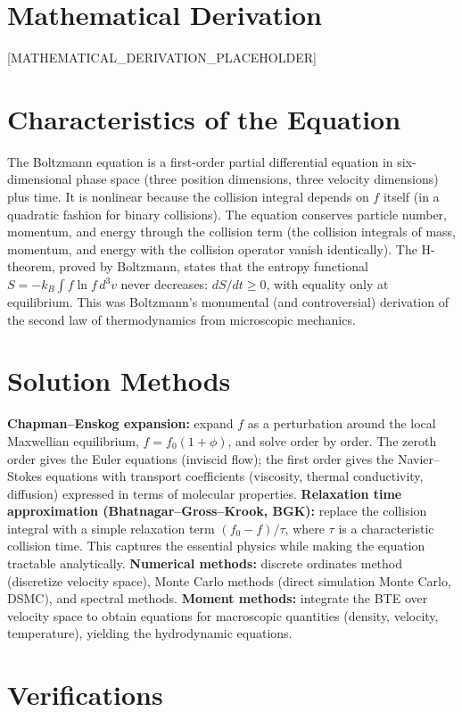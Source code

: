 \documentclass[11pt,openright]{book}
\begin{document}
\section*{Mathematical Derivation}

[MATHEMATICAL_DERIVATION_PLACEHOLDER]

\section*{Characteristics of the Equation}

The Boltzmann equation is a first-order partial differential equation in six-dimensional phase space (three position dimensions, three velocity dimensions) plus time. It is nonlinear because the collision integral depends on $f$ itself (in a quadratic fashion for binary collisions). The equation conserves particle number, momentum, and energy through the collision term (the collision integrals of mass, momentum, and energy with the collision operator vanish identically). The H-theorem, proved by Boltzmann, states that the entropy functional $S = -k_B\int f\ln f\,d^3v$ never decreases: $dS/dt \geq 0$, with equality only at equilibrium. This was Boltzmann's monumental (and controversial) derivation of the second law of thermodynamics from microscopic mechanics.
\section*{Solution Methods}

\textbf{Chapman--Enskog expansion:} expand $f$ as a perturbation around the local Maxwellian equilibrium, $f = f_0(1 + \phi)$, and solve order by order. The zeroth order gives the Euler equations (inviscid flow); the first order gives the Navier--Stokes equations with transport coefficients (viscosity, thermal conductivity, diffusion) expressed in terms of molecular properties. \textbf{Relaxation time approximation (Bhatnagar--Gross--Krook, BGK):} replace the collision integral with a simple relaxation term $(f_0 - f)/\tau$, where $\tau$ is a characteristic collision time. This captures the essential physics while making the equation tractable analytically. \textbf{Numerical methods:} discrete ordinates method (discretize velocity space), Monte Carlo methods (direct simulation Monte Carlo, DSMC), and spectral methods. \textbf{Moment methods:} integrate the BTE over velocity space to obtain equations for macroscopic quantities (density, velocity, temperature), yielding the hydrodynamic equations.
\section*{Verifications}
\end{document}
